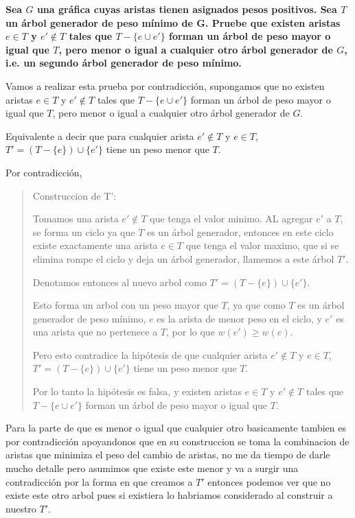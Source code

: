 \textbf{Sea $G$ una gr\'afica cuyas aristas tienen asignados pesos positivos. Sea $T$ un \'arbol generador de peso m\'inimo de G. Pruebe que existen aristas $e \in T$ y $e' \notin T$ tales que $T - \{e \cup e'\}$ forman un \'arbol de peso mayor o igual que $T$, pero menor o igual a cualquier otro \'arbol generador de $G$, i.e. un segundo \'arbol generador de peso m\'inimo.}\vspace{.2cm}

Vamos a realizar esta prueba por contradicci\'on, supongamos que no existen aristas $e \in T$ y $e' \notin T$ tales que $T - \{e \cup e'\}$ forman un \'arbol de peso mayor o igual que $T$, pero menor o igual a cualquier otro \'arbol generador de $G$. \vspace{.2cm}

Equivalente a decir que para cualquier arista $e' \notin T$ y $e \in T$, $T' = (T-\{e\}) \cup \{e'\}$ tiene un peso menor que $T$. \vspace{.2cm}

\textcolor{bibi}{Por contradicción,} \vspace{.2cm}
\begin{quote}
    Construccion de T': \vspace{.2cm}

    Tomamos una arista $e' \notin T$ que tenga el valor minimo. AL agregar $e'$ a $T$, se forma un ciclo ya que $T$ es un \'arbol generador, entonces en este ciclo existe exactamente una arista $e \in T$ que tenga el valor maximo, que si se elimina rompe el ciclo y deja un \'arbol generador, llamemos a este \'arbol $T'$. \vspace{.2cm}

    Denotamos entonces al nuevo arbol como $T' = (T-\{e\}) \cup \{e'\}$. \vspace{.2cm}  

    Esto forma un arbol con un peso mayor que $T$, ya que como $T$ es un \'arbol generador de peso m\'inimo, $e$ es la arista de menor peso en el ciclo, y $e'$ es una arista que no pertenece a $T$, por lo que $w(e') \geq w(e)$. \vspace{.2cm}

    Pero esto contradice la hip\'otesis de que cualquier arista $e' \notin T$ y $e \in T$, $T' = (T-\{e\}) \cup \{e'\}$ tiene un peso menor que $T$.\vspace{.2cm}

    Por lo tanto la hip\'otesis es falsa, y existen aristas $e \in T$ y $e' \notin T$ tales que $T - \{e \cup e'\}$ forman un \'arbol de peso mayor o igual que $T$. \vspace{.2cm}
\end{quote}

Para la parte de que es menor o igual que cualquier otro basicamente tambien es por contradicción apoyandonos que en su construccion se toma la combinacion de aristas que minimiza el peso del cambio de aristas, no me da tiempo de darle mucho detalle pero asumimos que existe este menor y va a surgir una contradicción por la forma en que creamos a $T'$ entonces podemos ver que no existe este otro arbol pues si existiera lo habriamos considerado al construir a nuestro $T'$. \vspace{.2cm}